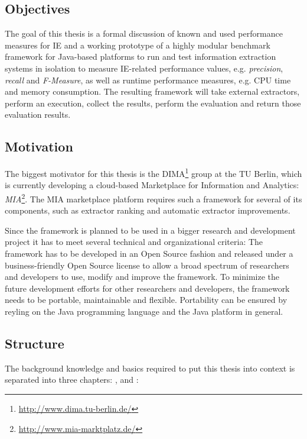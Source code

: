 \subsection{Objectives}
The goal of this thesis is a formal discussion of known and used performance measures for IE and a working prototype of a highly modular benchmark framework for Java-based platforms to run and test information extraction systems in isolation to measure IE-related performance values, e.g. \textit{precision}, \textit{recall} and \textit{F-Measure}, as well as runtime performance measures, e.g. CPU time and memory consumption. The resulting framework will take external extractors, perform an execution, collect the results, perform the evaluation and return those evaluation results.


\subsection{Motivation}
The biggest motivator for this thesis is the \gls{DIMA}\footnote{\url{http://www.dima.tu-berlin.de/}} group at the TU Berlin, which is currently developing a cloud-based Marketplace for Information and Analytics: \textit{MIA}\footnote{\url{http://www.mia-marktplatz.de/}}. The MIA marketplace platform requires such a framework for several of its components, such as extractor ranking and automatic extractor improvements.

Since the framework is planned to be used in a bigger research and development project it has to meet several technical and organizational criteria: The framework has to be developed in an Open Source fashion and released under a business-friendly Open Source license to allow a broad spectrum of researchers and developers to use, modify and improve the framework. To minimize the future development efforts for other researchers and developers, the framework needs to be portable, maintainable and flexible. Portability can be ensured by reyling on the Java programming language and the Java platform in general.

\subsection{Structure}
The background knowledge and basics required to put this thesis into context is separated into three chapters: ,  and :


